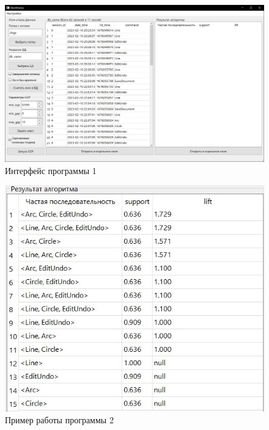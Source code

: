 \newpage
\begin{figure}[h!]
	\centering
	\includegraphics[width=1\textwidth]{inc/img/interface1.jpg}
	\caption{Интерфейс программы 1}
	\label{interface1}
\end{figure}


\newpage
\begin{figure}[h!] %
	\centering
	\includegraphics[width=1\textwidth]{inc/img/example1.jpg}
	\caption{Пример работы программы 2}
	\label{example1}
\end{figure}

